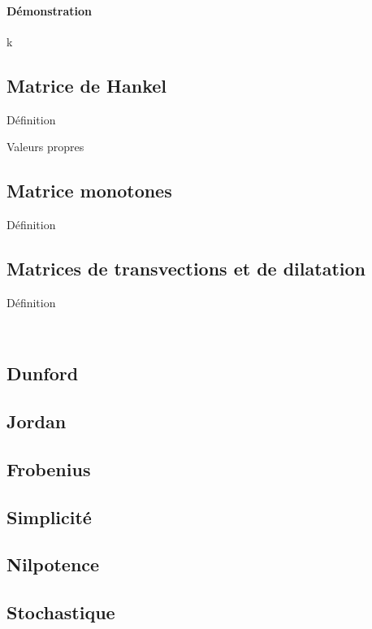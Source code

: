 \documentclass{book}
\begin{document}
\paragraph{Démonstration}
k
\subsection{Matrice de Hankel}
\begin{Définition}[]{Définition}{}

\end{Définition}
\begin{Propriété}[]{Valeurs propres}{}
    
\end{Propriété}
\subsection{Matrice monotones }
\begin{Définition}[]{Définition}{}

\end{Définition}
\subsection{Matrices de transvections et de dilatation}
\begin{Définition}[]{Définition}{}

\end{Définition}
\
\subsection{Dunford}
\subsection{Jordan}
\subsection{Frobenius}
\subsection{Simplicité}
\subsection{Nilpotence}
\subsection{Stochastique}
\end{document}
